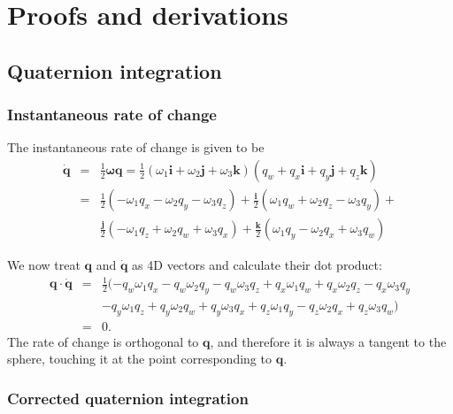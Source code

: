 \chapter{Proofs and derivations\label{proofs}}
\section{Quaternion integration\label{quatProofs}}
\subsection{Instantaneous rate of change\label{quatRateOfChangeOrthogonal}}
The instantaneous rate of change is given to be
\begin{eqnarray*}
\dot{\mathbf{q}} & = & \frac{1}{2}\bm{\omega q} =
    \frac{1}{2}(\omega_1\mathbf{i} + \omega_2\mathbf{j} + \omega_3\mathbf{k})
    (q_w + q_x\mathbf{i} + q_y\mathbf{j} + q_z\mathbf{k}) \\
& = & \frac{1}{2} ( - \omega_1 q_x - \omega_2 q_y - \omega_3 q_z ) +
    \frac{\mathbf{i}}{2} ( \omega_1 q_w + \omega_2 q_z - \omega_3 q_y ) + \\
&&  \frac{\mathbf{j}}{2} (-\omega_1 q_z + \omega_2 q_w + \omega_3 q_x ) +
    \frac{\mathbf{k}}{2} ( \omega_1 q_y - \omega_2 q_x + \omega_3 q_w )
\end{eqnarray*}

We now treat $\mathbf{q}$ and $\dot{\mathbf{q}}$ as 4D vectors and calculate
their dot product:
\begin{eqnarray*}
\mathbf{q}\cdot\dot{\mathbf{q}} & = & \frac{1}{2} (
    - q_w \omega_1 q_x - q_w \omega_2 q_y - q_w \omega_3 q_z
    + q_x \omega_1 q_w + q_x \omega_2 q_z - q_x \omega_3 q_y \\
&&  - q_y \omega_1 q_z + q_y \omega_2 q_w + q_y \omega_3 q_x
    + q_z \omega_1 q_y - q_z \omega_2 q_x + q_z \omega_3 q_w ) \\
& = & 0.
\end{eqnarray*}
The rate of change is orthogonal to $\mathbf{q}$, and therefore it is always
a tangent to the sphere, touching it at the point corresponding to $\mathbf{q}$.

\subsection{Corrected quaternion integration\label{quatIntegrationDerivation}}


